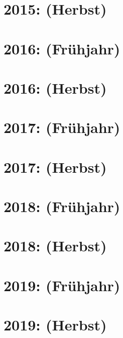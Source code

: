 \documentclass{lehramt-informatik-haupt}
\begin{document}
\section{2015: (Herbst)}


\section{2016: (Frühjahr)}


\section{2016: (Herbst)}


\section{2017: (Frühjahr)}


\section{2017: (Herbst)}


\section{2018: (Frühjahr)}


\section{2018: (Herbst)}


\section{2019: (Frühjahr)}


\section{2019: (Herbst)}

\end{document}

